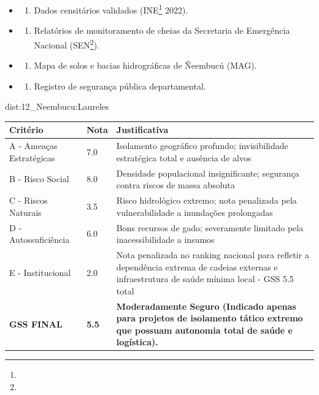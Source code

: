 {\begin{itemize}
\tightlist
\item
  \begin{enumerate}
  \def\labelenumi{\arabic{enumi})}
  \tightlist
  \item
    Dados censitários validados (INE\footnote{\fineINE} 2022).
  \end{enumerate}
\item
  \begin{enumerate}
  \def\labelenumi{\arabic{enumi})}
  \setcounter{enumi}{1}
  \tightlist
  \item
    Relatórios de monitoramento de cheias da Secretaria de Emergência
    Nacional (SEN\footnote{\fineSEN}).
  \end{enumerate}
\item
  \begin{enumerate}
  \def\labelenumi{\arabic{enumi})}
  \setcounter{enumi}{2}
  \tightlist
  \item
    Mapa de solos e bacias hidrográficas de Ñeembucú (MAG).
  \end{enumerate}
\item
  \begin{enumerate}
  \def\labelenumi{\arabic{enumi})}
  \setcounter{enumi}{3}
  \tightlist
  \item
    Registro de segurança pública departamental.
  \end{enumerate}
\end{itemize}}{dist:12_Neembucu:Laureles}
\begin{table}[ht!]
\small \begin{tabular}{p{3.0cm}p{0.8cm}p{6.0cm}} \toprule
\textbf{Critério} & \textbf{Nota} & \textbf{Justificativa} \\ \midrule
A - Ameaças Estratégicas & 7.0 & Isolamento geográfico profundo; invisibilidade estratégica total e ausência de alvos \\
B - Risco Social & 8.0 & Densidade populacional insignificante; segurança contra riscos de massa absoluta \\
C - Riscos Naturais & 3.5 & Risco hidrológico extremo; nota penalizada pela vulnerabilidade a inundações prolongadas \\
D - Autossuficiência & 6.0 & Bons recursos de gado; severamente limitado pela inacessibilidade a insumos \\
E - Institucional & 2.0 & Nota penalizada no ranking nacional para refletir a dependência extrema de cadeias externas e infraestrutura de saúde mínima local - GSS 5.5 total \\
\midrule \textbf{GSS FINAL} & \textbf{5.5} & \textbf{Moderadamente Seguro (Indicado apenas para projetos de isolamento tático extremo que possuam autonomia total de saúde e logística).} \\ \bottomrule \end{tabular}
\end{table}
